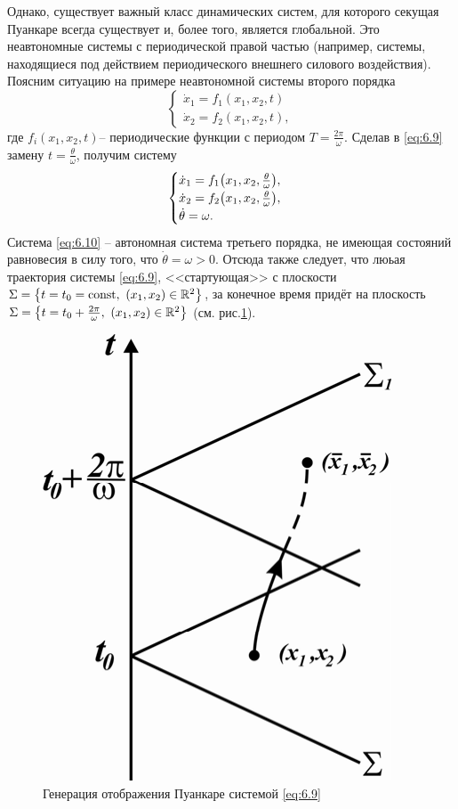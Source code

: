 Однако, существует важный класс динамических систем, для которого
секущая Пуанкаре всегда существует и, более того, является глобальной. Это
неавтономные системы с периодической правой частью (например, системы,
находящиеся под действием периодического внешнего силового воздействия).
Поясним ситуацию на примере неавтономной системы второго порядка
\begin{equation}
        \label{eq:6.9}
        \begin{cases}
                \dot x_1 = f_1 (x_1,x_2,t) \\
                \dot x_2 = f_2 (x_1,x_2,t), 
        \end{cases}
\end{equation}
где $f_i(x_1,x_2,t)$-- периодические функции с периодом $T = \frac{2 \pi}{\omega}.$ Сделав в \eqref{eq:6.9} замену $t = \frac{\theta}{\omega}$, получим систему
\begin{equation}
        \label{eq:6.10}
        \begin{cases}
                \dot x_1 = f_1 \qty( x_1,x_2, \frac{\theta}{\omega}),\\
                \dot x_2 = f_2 \qty(x_1,x_2, \frac{\theta}{\omega}), \\
                \dot \theta = \omega.\\
        \end{cases}
\end{equation}
Система \eqref{eq:6.10} -- автономная система третьего порядка, не имеющая
состояний равновесия в силу того, что $\dot \theta = \omega>0$. Отсюда также следует, что люьая траектория системы \eqref{eq:6.9}, <<стартующая>> с плоскости 
$\Sigma = \qty{ t =t_0=\textrm{const}, ~ ( x_1,x_2) \in \mathbb{R}^2}$, за конечное время придёт на плоскость
$\Sigma = \qty{ t=t_0 + \frac{2\pi}{\omega}, ~ (x_1,x_2) \in \mathbb{R}^2}$ (см. рис.\ref{fig:6.2}).
\begin{figure}[h]
        \centering
        \includegraphics[]{fig/lect6/2}
        \caption{Генерация отображения Пуанкаре системой \eqref{eq:6.9}}
        \label{fig:6.2}
\end{figure}
